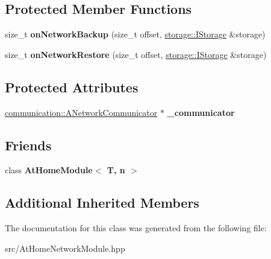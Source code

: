 \subsection*{Protected Member Functions}
\begin{DoxyCompactItemize}
\item 
\mbox{\label{classathome_1_1module_1_1_at_home_network_module_a0c4aee514ee078a15251c64c21c74f3a}} 
size\+\_\+t {\bfseries on\+Network\+Backup} (size\+\_\+t offset, \mbox{\hyperlink{classathome_1_1storage_1_1_i_storage}{storage\+::\+I\+Storage}} \&storage)
\item 
\mbox{\label{classathome_1_1module_1_1_at_home_network_module_acf595295e05d0dd9e3a4929bb881bf9b}} 
size\+\_\+t {\bfseries on\+Network\+Restore} (size\+\_\+t offset, \mbox{\hyperlink{classathome_1_1storage_1_1_i_storage}{storage\+::\+I\+Storage}} \&storage)
\end{DoxyCompactItemize}
\subsection*{Protected Attributes}
\begin{DoxyCompactItemize}
\item 
\mbox{\label{classathome_1_1module_1_1_at_home_network_module_a7c7dba4c623bd8d4d9bb898b6ba9ae63}} 
\mbox{\hyperlink{classathome_1_1communication_1_1_a_network_communicator}{communication\+::\+A\+Network\+Communicator}} $\ast$ {\bfseries \+\_\+communicator}
\end{DoxyCompactItemize}
\subsection*{Friends}
\begin{DoxyCompactItemize}
\item 
\mbox{\label{classathome_1_1module_1_1_at_home_network_module_a5db9640f2e295c39a19645b0d682d7d5}} 
class {\bfseries At\+Home\+Module$<$ T, n $>$}
\end{DoxyCompactItemize}
\subsection*{Additional Inherited Members}


The documentation for this class was generated from the following file\+:\begin{DoxyCompactItemize}
\item 
src/At\+Home\+Network\+Module.\+hpp\end{DoxyCompactItemize}
